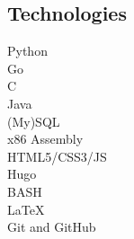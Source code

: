 \documentclass{article}
\let\oldsubsection\subsection
\renewcommand{\subsection}[1]{
    \oldsubsection*{#1}
    \vspace{-5pt}
}
\begin{document}
\begin{paracol}{2}
    \subsection{Technologies}
    Python \ \faPython \\
    Go \ \faGoogle \\
    C \ \faFileCode \\
    Java \ \faJava\\
    (My)SQL \ \faDatabase \\
    x86 Assembly \ \faMicrochip \\
    HTML5/CSS3/JS \ \faCode \\
    Hugo \ \faGlobe \\
    BASH \ \faTerminal \\
    LaTeX \ \faFilePdf \\
    Git and GitHub \ \faGithub

    \vspace{100pt}

    \begin{center}
        \hypersetup{urlcolor=black}
    \end{center}
\end{paracol}
\end{document}
